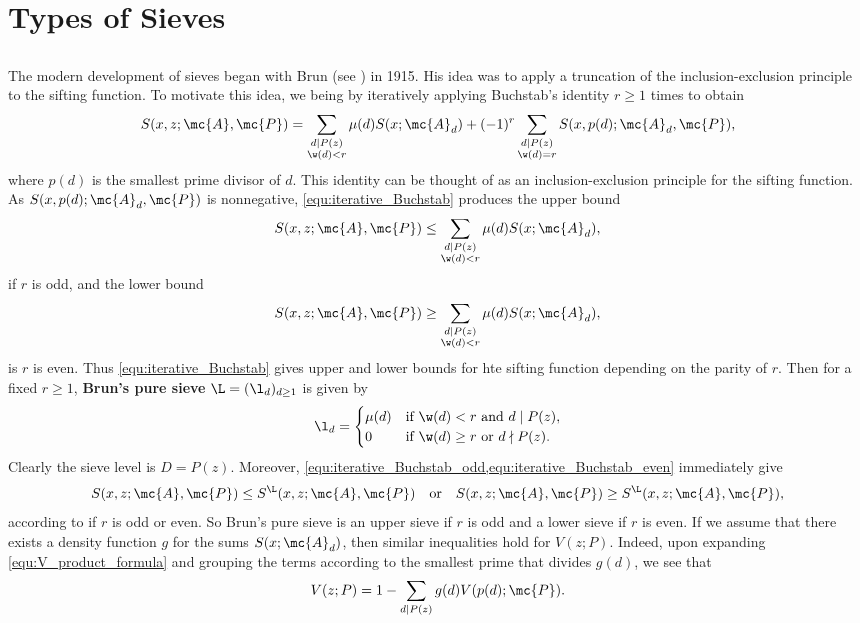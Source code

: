 \chapter{Types of Sieves}
  \section{}
    The modern development of sieves began with Brun (see \cite{brun1915uber}) in 1915. His idea was to apply a truncation of the inclusion-exclusion principle to the sifting function. To motivate this idea, we being by iteratively applying Buchstab's identity $r \ge 1$ times to obtain
    \begin{equation}\label{equ:iterative_Buchstab}
      S(x,z;\mc{A},\mc{P}) = \sum_{\substack{d \mid P(z) \\ \w(d) < r}}\mu(d)S(x;\mc{A}_{d})+(-1)^{r}\sum_{\substack{d \mid P(z) \\ \w(d) = r}}S(x,p(d);\mc{A}_{d},\mc{P}),
    \end{equation}
    where $p(d)$ is the smallest prime divisor of $d$. This identity can be thought of as an inclusion-exclusion principle for the sifting function. As $S(x,p(d);\mc{A}_{d},\mc{P})$ is nonnegative, \cref{equ:iterative_Buchstab} produces the upper bound
    \begin{equation}\label{equ:iterative_Buchstab_odd}
      S(x,z;\mc{A},\mc{P}) \le \sum_{\substack{d \mid P(z) \\ \w(d) < r}}\mu(d)S(x;\mc{A}_{d}),
    \end{equation}
    if $r$ is odd, and the lower bound
    \begin{equation}\label{equ:iterative_Buchstab_even}
      S(x,z;\mc{A},\mc{P}) \ge \sum_{\substack{d \mid P(z) \\ \w(d) < r}}\mu(d)S(x;\mc{A}_{d}),
    \end{equation}
    is $r$ is even. Thus \cref{equ:iterative_Buchstab} gives upper and lower bounds for hte sifting function depending on the parity of $r$. Then for a fixed $r \ge 1$, \textbf{Brun's pure sieve} $\L = (\l_{d})_{d \ge 1}$ is given by
    \[
      \l_{d} = \begin{cases} \mu(d) & \text{if $\w(d) < r$ and $d \mid P(z)$}, \\ 0 & \text{if $\w(d) \ge r$ or $d \nmid P(z)$}. \end{cases}
    \]
    Clearly the sieve level is $D = P(z)$. Moreover, \cref{equ:iterative_Buchstab_odd,equ:iterative_Buchstab_even} immediately give
    \[
      S(x,z;\mc{A},\mc{P}) \le S^{\L}(x,z;\mc{A},\mc{P}) \quad \text{or} \quad S(x,z;\mc{A},\mc{P}) \ge S^{\L}(x,z;\mc{A},\mc{P}),
    \]
    according to if $r$ is odd or even. So Brun's pure sieve is an upper sieve if $r$ is odd and a lower sieve if $r$ is even. If we assume that there exists a density function $g$ for the sums $S(x;\mc{A}_{d})$, then similar inequalities hold for $V(z;P)$. Indeed, upon expanding \cref{equ:V_product_formula} and grouping the terms according to the smallest prime that divides $g(d)$, we see that
    \[
      V(z;P) = 1-\sum_{d \mid P(z)}g(d)V(p(d);\mc{P}).
    \]
